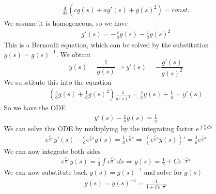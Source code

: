 \begin{enumerate}
\[\begin{split}
            \frac{d}{ds} \left(cg(s) + a g'(s) + g(s)^2\right) = const.
        \end{split}
    \]
    We assume it is homogeneous, so we have
    \[
        \begin{split}
            g'(s) =- \frac{c}{a} g(s)  -\frac{1}{a} g(s)^2
        \end{split}
    \]
    This is a Bernoulli equation, which can be solved by the substitution \(y(s) = g(s)^{-1}\). We obtain
    \[
        y(s) = \frac{1}{g(s)} \Rightarrow y'(s) = -\frac{g'(s)}{g(s)^2} 
    \]
    We substitute this into the equation
    \[
        \begin{split}
            \left(\frac{c}{a} g(s)  + \frac{1}{a} g(s)^2\right) \frac{1}{g(s)^2} = \frac{c}{a} y(s) + \frac{1}{a} = y'(s)
        \end{split}
    \]
    So we have the ODE  
    \[
        \begin{split}
            y'(s) - \frac{c}{a} y(s) = \frac{1}{a}
        \end{split}
    \]
    We can solve this ODE by multiplying by the integrating factor \(e^{\int \frac{c}{a} \, ds}\)
    \[
        \begin{split}
            e^{\frac{c}{a}s} y'(s) - \frac{c}{a} e^{\frac{c}{a}s} y(s) = \frac{1}{a} e^{\frac{c}{a}s} \Rightarrow \left(e^{\frac{c}{a}s} y(s)\right)' = \frac{1}{a} e^{\frac{c}{a}s}
        \end{split}
    \]
    We can now integrate both sides
    \[
        \begin{split}
            e^{\frac{c}{a}s} y(s) = \frac{1}{a} \int e^{\frac{c}{a}s} \, ds \Rightarrow y(s) = \frac{1}{c} + C e^{-\frac{c}{a}s}
        \end{split}
    \]
    We can now substitute back \(y(s) = g(s)^{-1}\) and solve for \(g(s)\)
    \[
        \begin{split}
            g(s) = y(s)^{-1} = \frac{1}{\frac{1}{c} + C e^{-\frac{c}{a}s}}
        \end{split}
    \]
\end{enumerate}

\newpage

